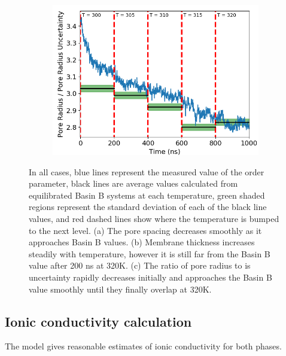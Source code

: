 \documentclass{article}
\begin{document}
\begin{figure}
\begin{subfigure}{0.325\textwidth}
		\includegraphics[width=\textwidth]{order_layered.png}
		\caption{}\label{fig:order_layered}
	\end{subfigure}
	\caption{In all cases, blue lines represent the measured value of
	the order parameter, black lines are average values calculated from
	equilibrated Basin B systems at each temperature, green shaded regions
	represent the standard deviation of each of the black line values, and 
	red dashed lines show where the temperature is bumped to the next level.
	(a) The pore spacing decreases smoothly as it approaches Basin B values.
	(b) Membrane thickness increases steadily with temperature, however
	it is still far from the Basin B value after 200 ns at 320K. (c) The
	ratio of pore radius to is uncertainty rapidly decreases initially and
	approaches the Basin B value smoothly until they finally overlap at 320K.}\label{fig:phase_transition}
  \end{figure}

  \subsection*{Ionic conductivity calculation}

  The model gives reasonable estimates of ionic conductivity for both phases.
  
\end{document}
